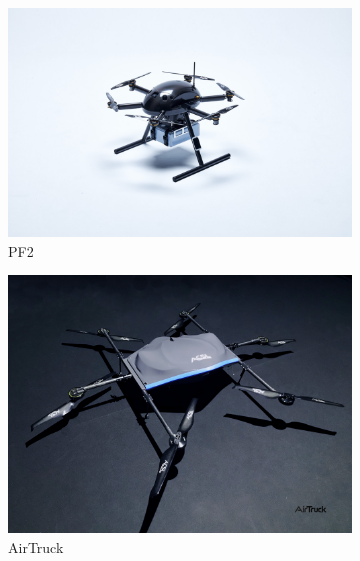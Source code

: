 \begin{figure}
    \centering
    \begin{subfigure}[b]{0.45\textwidth}
        \centering
        \includegraphics[width=\textwidth]{partes/ImgJoao/PF2.jpg}
        \caption{PF2}
        \label{fig:pf2}
    \end{subfigure}
    \hfill
    \begin{subfigure}[b]{0.45\textwidth}
        \centering
        \includegraphics[width=\textwidth]{partes/ImgJoao/AirTruck.jpg}
        \caption{AirTruck}
        \label{fig:AirTruck}
    \end{subfigure}
    \break
    \begin{subfigure}[b]{0.45\textwidth}
        \centering

\end{subfigure}
\end{figure}
